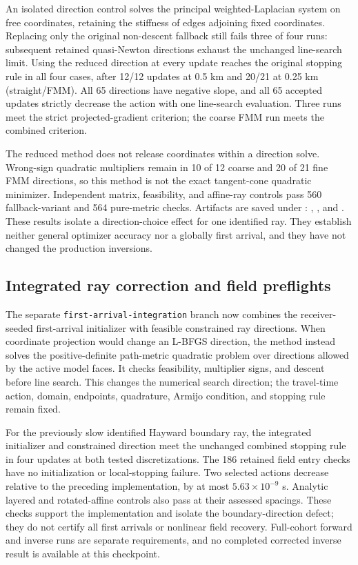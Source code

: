 \documentclass[11pt]{article}
\begin{document}
An isolated direction control solves the principal weighted-Laplacian system
on free coordinates, retaining the stiffness of edges adjoining fixed
coordinates. Replacing only the original non-descent fallback still fails
three of four runs: subsequent retained quasi-Newton directions exhaust
the unchanged line-search limit. Using the reduced direction at every update
reaches the original stopping rule in all four cases, after 12/12 updates at
0.5 km and 20/21 at 0.25 km (straight/FMM). All 65 directions have negative
slope, and all 65 accepted updates strictly decrease the action with one
line-search evaluation. Three runs meet the strict projected-gradient
criterion; the coarse FMM run meets the combined criterion.

The reduced method does not release coordinates within a direction solve.
Wrong-sign quadratic multipliers remain in 10 of 12 coarse and 20 of 21 fine
FMM directions, so this method is not the exact tangent-cone quadratic
minimizer. Independent matrix, feasibility, and affine-ray controls pass
560 fallback-variant and 564 pure-metric checks. Artifacts are saved under
: ,
, and .
These results isolate a direction-choice effect for one identified ray.
They establish neither general optimizer accuracy nor a globally first
arrival, and they have not changed the production inversions.

\subsection{Integrated ray correction and field preflights}
The separate \texttt{first-arrival-integration} branch now combines the
receiver-seeded first-arrival initializer with feasible constrained ray
directions. When coordinate projection would change an L-BFGS direction,
the method instead solves the positive-definite path-metric quadratic
problem over directions allowed by the active model faces. It checks
feasibility, multiplier signs, and descent before line search. This changes
the numerical search direction; the travel-time action, domain, endpoints,
quadrature, Armijo condition, and stopping rule remain fixed.

For the previously slow identified Hayward boundary ray, the integrated
initializer and constrained direction meet the unchanged combined stopping
rule in four updates at both tested discretizations. The 186 retained field
entry checks have no initialization or local-stopping failure. Two selected
actions decrease relative to the preceding implementation, by at most
$5.63\times10^{-9}$ s. Analytic layered and rotated-affine controls also pass
at their assessed spacings. These checks support the implementation and
isolate the boundary-direction defect; they do not certify all first
arrivals or nonlinear field recovery. Full-cohort forward and inverse runs
are separate requirements, and no completed corrected inverse result is
available at this checkpoint.
\end{document}
